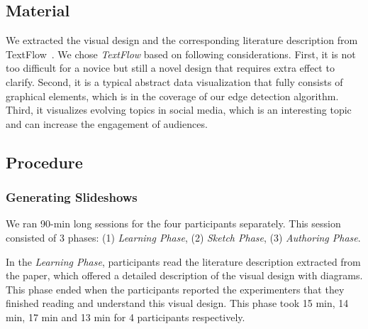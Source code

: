 \subsection{Material}
We extracted the visual design and the corresponding literature description from TextFlow~\cite{cui_textflow:_2011}. 
We chose \textit{TextFlow} based on following considerations. First, it is not too difficult for a novice but still a novel design that requires extra effect to clarify.
Second, it is a typical abstract data visualization that fully consists of graphical elements, which is in the coverage of our edge detection algorithm. 
Third, it visualizes evolving topics in social media, which is an interesting topic and can increase the engagement of audiences. 


\subsection{Procedure}
\subsubsection{Generating Slideshows}
We ran 90-min long sessions for the four participants  separately. This session consisted of 3 phases: (1) \textit{Learning Phase}, (2) \textit{Sketch Phase}, (3) \textit{Authoring Phase}.

In the \textit{Learning Phase}, participants read the literature description extracted from the paper, which offered a detailed description of the visual design with diagrams. This phase ended when the participants reported the experimenters  that they finished reading and understand this visual design. 
This phase took 15 min, 14 min, 17 min and 13 min for 4 participants respectively. 

